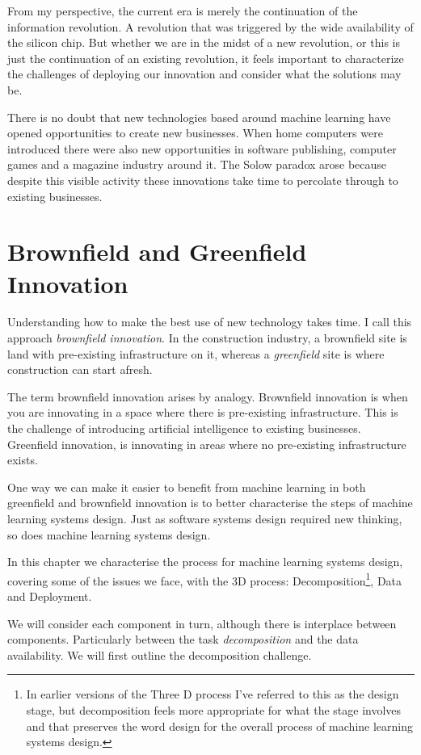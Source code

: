 \documentclass[a4paper]{caesar_book}
\begin{document}
From my perspective, the current era is merely the continuation of the information revolution. A revolution that was triggered by the wide availability of the silicon chip. But whether we are in the midst of a new revolution, or this is just the continuation of an existing revolution, it feels important to characterize the challenges of deploying our innovation and consider what the solutions may be.

There is no doubt that new technologies based around machine learning have opened opportunities to create new businesses. When home computers were introduced there were also new opportunities in software publishing, computer games and a magazine industry around it. The Solow paradox arose because despite this visible activity these innovations take time to percolate through to existing businesses.

\section{Brownfield and Greenfield Innovation}
Understanding how to make the best use of new technology takes time. I call this approach \textit{brownfield innovation}. In the construction industry, a brownfield site is land with pre-existing infrastructure on it, whereas a \textit{greenfield} site is where construction can start afresh.

The term brownfield innovation arises by analogy. Brownfield innovation is when you are innovating in a space where there is pre-existing infrastructure. This is the challenge of introducing artificial intelligence to existing businesses. Greenfield innovation, is innovating in areas where no pre-existing infrastructure exists.

One way we can make it easier to benefit from machine learning in both greenfield and brownfield innovation is to better characterise the steps of machine learning systems design. Just as software systems design required new thinking, so does machine learning systems design.

In this chapter we characterise the process for machine learning systems design, covering some of the issues we face, with the 3D process: Decomposition\footnote{In earlier versions of the Three D process I've referred to this as the design stage, but decomposition feels more appropriate for what the stage involves and that preserves the word design for the overall process of machine learning systems design.}, Data and Deployment.

We will consider each component in turn, although there is interplace between components. Particularly between the task \textit{decomposition} and the data availability. We will first outline the decomposition challenge.
\end{document}
